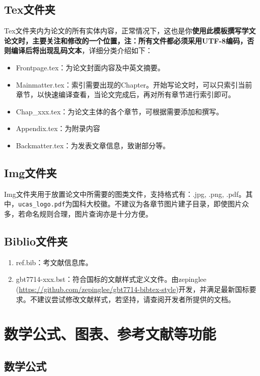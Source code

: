 \subsection{Tex文件夹}

Tex文件夹内为论文的所有实体内容，正常情况下，这也是你\textbf{使用此模板撰写学文论文时，主要关注和修改的一个位置，注：所有文件都必须采用UTF-8编码，否则编译后将出现乱码文本}，详细分类介绍如下：

\begin{itemize}
  \item Frontpage.tex：为论文封面内容及中英文摘要。
  \item Mainmatter.tex：索引需要出现的Chapter。开始写论文时，可以只索引当前章节，以快速编译查看，当论文完成后，再对所有章节进行索引即可。
  \item Chap{\_}xxx.tex：为论文主体的各个章节，可根据需要添加和撰写。
  \item Appendix.tex：为附录内容
  \item Backmatter.tex：为发表文章信息，致谢部分等。
\end{itemize}

\subsection{Img文件夹}

Img文件夹用于放置论文中所需要的图类文件，支持格式有：.jpg, .png, .pdf。其中，\verb|ucas_logo.pdf|为国科大校徽。不建议为各章节图片建子目录，即使图片众多，若命名规则合理，图片查询亦是十分方便。

\subsection{Biblio文件夹}

\begin{enumerate}
    \item ref.bib：考文献信息库。
    \item gbt7714-xxx.bst：符合国标的文献样式定义文件。由zepinglee (\url{https://github.com/zepinglee/gbt7714-bibtex-style})开发，并满足最新国标要求。不建议尝试修改文献样式，若坚持，请查阅开发者所提供的文档。
\end{enumerate}

\section{数学公式、图表、参考文献等功能}

\subsection{数学公式}

